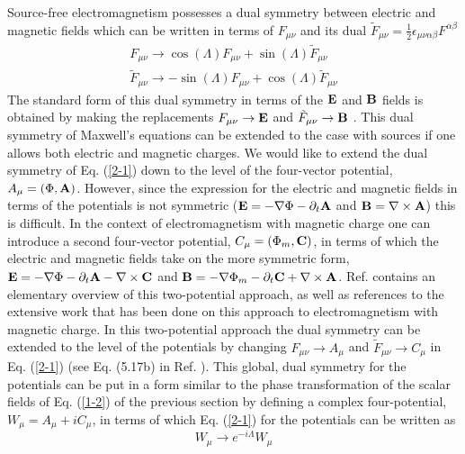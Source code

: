 \documentclass[a4paper,aps]{revtex4}
\begin{document}
Source-free electromagnetism possesses a dual symmetry
between electric and magnetic fields which can be
written in terms of $F_{\mu\nu}$ and its dual
${\tilde F}_{\mu \nu} =\frac{1}{2} \epsilon _{\mu \nu \alpha \beta}
F^{\alpha \beta}$ \cite{fels}
\begin{eqnarray}
\label{2-1}
F_{\mu \nu} \rightarrow \cos(\Lambda ) F_{\mu \nu} + \sin(\Lambda )
{\tilde F}_{\mu \nu}
\\
{\tilde F}_{\mu \nu} \rightarrow -\sin(\Lambda ) F_{\mu \nu} + \cos(\Lambda )
{\tilde F}_{\mu \nu} \nonumber
\end{eqnarray}
The standard form of this dual symmetry in terms of the
${\bf E}$ and ${\bf B}$ fields is obtained by making the replacements
$F_{\mu \nu} \rightarrow {\bf E}$ and ${\tilde F}_{\mu \nu} \rightarrow
{\bf B}$ \cite{jackson}. This dual symmetry of Maxwell's equations
can be extended to the case with sources if one allows both electric
and magnetic charges. We would like to extend the dual
symmetry of Eq. (\ref{2-1}) down to the level of the four-vector
potential, $A_{\mu} = (\Phi , {\bf A})$. However, since the
expression for the electric and magnetic fields in terms of the
potentials is not symmetric (${\bf E} = -\nabla \Phi - \partial _t {\bf A}$
and ${\bf B} = \nabla \times {\bf A}$) this is difficult. In the
context of electromagnetism with magnetic charge one can introduce
a second four-vector potential, $C_{\mu} = (\Phi _m , {\bf C})$,
\cite{cabibbo} \cite{zwang} in terms of which the electric and
magnetic fields take on the more symmetric form, 
${\bf E} = -\nabla \Phi - \partial _t {\bf A} -\nabla \times {\bf C}$
and  ${\bf B} = -\nabla \Phi_m - \partial _t {\bf C} +
\nabla \times {\bf A}$. Ref. \cite{sing1} contains an elementary
overview of this two-potential approach, as well as
references to the extensive work that has been done on this
approach to electromagnetism with magnetic charge. In this two-potential
approach the dual symmetry can be extended to the level of
the potentials by changing $F_{\mu \nu} \rightarrow A_{\mu}$ and
${\tilde F}_{\mu \nu} \rightarrow C_{\mu}$ in Eq. (\ref{2-1}) (see
Eq. (5.17b) in Ref. \cite{zwang}).
This global, dual symmetry for the potentials can be put in
a form similar to the phase transformation of the scalar fields
of Eq. (\ref{1-2}) of the previous section by defining a complex
four-potential, $W_{\mu} = A_{\mu} + i C_{\mu}$, in terms of which
Eq. (\ref{2-1}) for the potentials can be written as
\begin{equation}
\label{2-2}
W_{\mu} \rightarrow e^{-i \Lambda} W_{\mu}
\end{equation}
\end{document}
